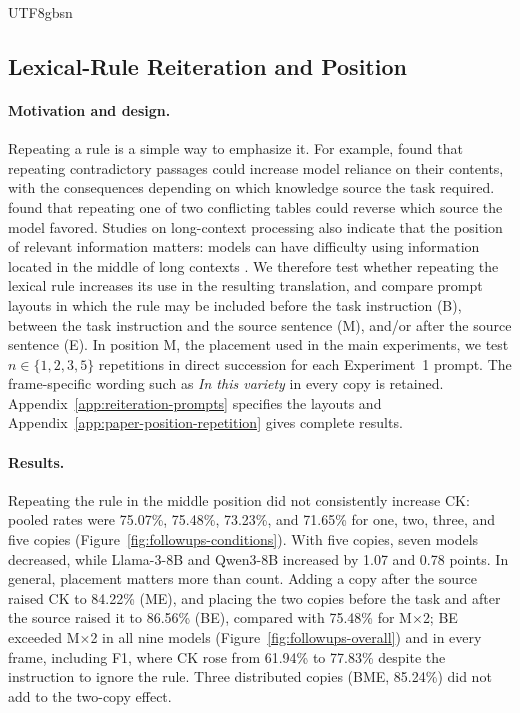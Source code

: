 \documentclass[11pt]{article}
\begin{document}
\begin{CJK*}{UTF8}{gbsn}
\subsection{Lexical-Rule Reiteration and Position}
\label{sec:reiteration}

\paragraph{Motivation and design.}
Repeating a rule is a simple way to emphasize it. For example, \citet{sun2026taskmatters} found that repeating contradictory passages could increase model reliance on their contents, with the consequences depending on which knowledge source the task required. \citet{schuster2026source} found that repeating one of two conflicting tables could reverse which source the model favored. Studies on long-context processing also 
indicate that the position of relevant information matters: models can have difficulty using information located in the middle of long contexts \citep{li2025long,liuetal-2024-lost}. We therefore test whether repeating the lexical rule increases its use in the resulting translation, and compare prompt layouts in which the rule may be included before the task instruction (B), between the task instruction and the source sentence (M), and/or after the source sentence (E). In position M, the placement used in the main experiments, we test $n \in \{1, 2, 3, 5\}$ repetitions in direct succession for each Experiment~1 prompt. The frame-specific wording such as \emph{In this variety} in every copy is retained. Appendix~\ref{app:reiteration-prompts} specifies the layouts and Appendix~\ref{app:paper-position-repetition} gives complete results. 

\paragraph{Results.}
Repeating the rule in the middle position did not consistently increase CK: pooled rates were 75.07\%, 75.48\%, 73.23\%, and 71.65\% for one, two, three, and five copies (Figure~\ref{fig:followups-conditions}). With five copies, seven models decreased, while Llama-3-8B and Qwen3-8B increased by 1.07 and 0.78 points. In general, placement matters more than count. Adding a copy after the source raised CK to 84.22\% (ME), and placing the two copies before the task and after the source raised it to 86.56\% (BE), compared with 75.48\% for M$\times$2; BE exceeded M$\times$2 in all nine models (Figure~\ref{fig:followups-overall}) and in every frame, including F1, where CK rose from 61.94\% to 77.83\% despite the instruction to ignore the rule. Three distributed copies (BME, 85.24\%) did not add to the two-copy effect.


\end{CJK*}
\end{document}
